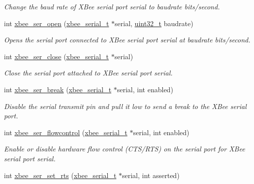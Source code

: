 \begin{DoxyCompactItemize}
\begin{DoxyCompactList}\small\item\em Change the baud rate of X\-Bee serial port {\itshape serial} to {\itshape baudrate} bits/second. \end{DoxyCompactList}\item 
int \hyperlink{group__hal__win32_gaa615a221dd69c17ee2989c281f2bf04a}{xbee\-\_\-ser\-\_\-open} (\hyperlink{structxbee__serial__t}{xbee\-\_\-serial\-\_\-t} $\ast$serial, \hyperlink{group__hal__dos_ga09a1e304d66d35dd47daffee9731edaa}{uint32\-\_\-t} baudrate)
\begin{DoxyCompactList}\small\item\em Opens the serial port connected to X\-Bee serial port {\itshape serial} at {\itshape baudrate} bits/second. \end{DoxyCompactList}\item 
int \hyperlink{group__hal__win32_ga48b9d743a446074ea6abacd0de24044d}{xbee\-\_\-ser\-\_\-close} (\hyperlink{structxbee__serial__t}{xbee\-\_\-serial\-\_\-t} $\ast$serial)
\begin{DoxyCompactList}\small\item\em Close the serial port attached to X\-Bee serial port {\itshape serial}. \end{DoxyCompactList}\item 
int \hyperlink{group__hal__win32_ga6ae89792415a7ac8b45b56188eb9eeb4}{xbee\-\_\-ser\-\_\-break} (\hyperlink{structxbee__serial__t}{xbee\-\_\-serial\-\_\-t} $\ast$serial, int enabled)
\begin{DoxyCompactList}\small\item\em Disable the serial transmit pin and pull it low to send a break to the X\-Bee serial port. \end{DoxyCompactList}\item 
int \hyperlink{group__hal__win32_ga1f5f72ffdfbfb45ac523640db32296ff}{xbee\-\_\-ser\-\_\-flowcontrol} (\hyperlink{structxbee__serial__t}{xbee\-\_\-serial\-\_\-t} $\ast$serial, int enabled)
\begin{DoxyCompactList}\small\item\em Enable or disable hardware flow control (C\-T\-S/\-R\-T\-S) on the serial port for X\-Bee serial port {\itshape serial}. \end{DoxyCompactList}\item 
int \hyperlink{group__hal__win32_ga731188d8cf41d3d749bc84d51b672535}{xbee\-\_\-ser\-\_\-set\-\_\-rts} (\hyperlink{structxbee__serial__t}{xbee\-\_\-serial\-\_\-t} $\ast$serial, int asserted)

\end{DoxyCompactItemize}
